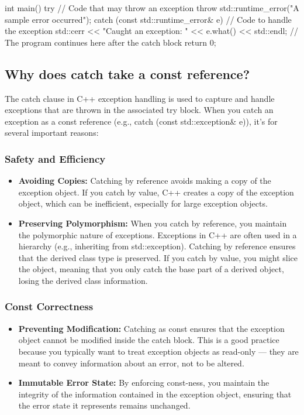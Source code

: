 \documentclass{report}
\begin{document}
\begin{concept}
\begin{cppcode}
        int main() {
            try {
                // Code that may throw an exception
                throw std::runtime_error("A sample error occurred");
            } catch (const std::runtime_error& e) {
                // Code to handle the exception
                std::cerr << "Caught an exception: " << e.what() << std::endl;
            }
            // The program continues here after the catch block
            return 0;
        }

    \end{cppcode}

    \bigbreak \noindent 
    \subsection{Why does catch take a const reference?}
    \bigbreak \noindent 
    The catch clause in C++ exception handling is used to capture and handle exceptions that are thrown in the associated try block. When you catch an exception as a const reference (e.g., catch (const std::exception& e)), it's for several important reasons:
    \bigbreak \noindent 
    \subsubsection{Safety and Efficiency}
    \begin{itemize}
        \item \textbf{Avoiding Copies:} Catching by reference avoids making a copy of the exception object. If you catch by value, C++ creates a copy of the exception object, which can be inefficient, especially for large exception objects.
        \item \textbf{Preserving Polymorphism:} When you catch by reference, you maintain the polymorphic nature of exceptions. Exceptions in C++ are often used in a hierarchy (e.g., inheriting from std::exception). Catching by reference ensures that the derived class type is preserved. If you catch by value, you might slice the object, meaning that you only catch the base part of a derived object, losing the derived class information.
    \end{itemize}

    \bigbreak \noindent 
    \subsubsection{Const Correctness}
    \bigbreak \noindent 
    \begin{itemize}
        \item \textbf{Preventing Modification:} Catching as const ensures that the exception object cannot be modified inside the catch block. This is a good practice because you typically want to treat exception objects as read-only — they are meant to convey information about an error, not to be altered.
        \item \textbf{Immutable Error State:} By enforcing const-ness, you maintain the integrity of the information contained in the exception object, ensuring that the error state it represents remains unchanged.
    \end{itemize}


\end{concept}
\end{document}
